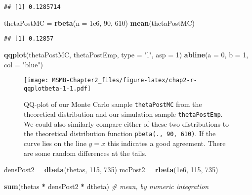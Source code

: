 \documentclass[]{article}
\newenvironment{Shaded}{\begin{snugshade}}{\end{snugshade}}
\newcommand{\KeywordTok}[1]{\textcolor[rgb]{0.13,0.29,0.53}{\textbf{#1}}}
\newcommand{\DataTypeTok}[1]{\textcolor[rgb]{0.13,0.29,0.53}{#1}}
\newcommand{\DecValTok}[1]{\textcolor[rgb]{0.00,0.00,0.81}{#1}}
\newcommand{\FloatTok}[1]{\textcolor[rgb]{0.00,0.00,0.81}{#1}}
\newcommand{\StringTok}[1]{\textcolor[rgb]{0.31,0.60,0.02}{#1}}
\newcommand{\CommentTok}[1]{\textcolor[rgb]{0.56,0.35,0.01}{\textit{#1}}}
\newcommand{\OperatorTok}[1]{\textcolor[rgb]{0.81,0.36,0.00}{\textbf{#1}}}
\newcommand{\NormalTok}[1]{#1}
\begin{document}
\begin{verbatim}
## [1] 0.1285714
\end{verbatim}

\begin{Shaded}
\begin{Highlighting}[]
\NormalTok{thetaPostMC =}\StringTok{ }\KeywordTok{rbeta}\NormalTok{(}\DataTypeTok{n =} \FloatTok{1e6}\NormalTok{, }\DecValTok{90}\NormalTok{, }\DecValTok{610}\NormalTok{)}
\KeywordTok{mean}\NormalTok{(thetaPostMC)}
\end{Highlighting}
\end{Shaded}

\begin{verbatim}
## [1] 0.12857
\end{verbatim}

\begin{Shaded}
\begin{Highlighting}[]
\KeywordTok{qqplot}\NormalTok{(thetaPostMC, thetaPostEmp, }\DataTypeTok{type =} \StringTok{"l"}\NormalTok{, }\DataTypeTok{asp =} \DecValTok{1}\NormalTok{)}
\KeywordTok{abline}\NormalTok{(}\DataTypeTok{a =} \DecValTok{0}\NormalTok{, }\DataTypeTok{b =} \DecValTok{1}\NormalTok{, }\DataTypeTok{col =} \StringTok{"blue"}\NormalTok{)}
\end{Highlighting}
\end{Shaded}

\begin{figure}
\centering
\texttt{[image: MSMB-Chapter2\_files/figure-latex/chap2-r-qqplotbeta-1-1.pdf]}
\caption{QQ-plot of our Monte Carlo sample \texttt{thetaPostMC} from the
theoretical distribution and our simulation sample
\texttt{thetaPostEmp}. We could also similarly compare either of these
two distributions to the theoretical distribution function
\texttt{pbeta(.,\ 90,\ 610)}. If the curve lies on the line \(y=x\) this
indicates a good agreement. There are some random differences at the
tails.}
\end{figure}

\begin{Shaded}
\begin{Highlighting}[]
\NormalTok{densPost2 =}\StringTok{ }\KeywordTok{dbeta}\NormalTok{(thetas, }\DecValTok{115}\NormalTok{, }\DecValTok{735}\NormalTok{)}
\NormalTok{mcPost2   =}\StringTok{ }\KeywordTok{rbeta}\NormalTok{(}\FloatTok{1e6}\NormalTok{, }\DecValTok{115}\NormalTok{, }\DecValTok{735}\NormalTok{)}

\KeywordTok{sum}\NormalTok{(thetas }\OperatorTok{*}\StringTok{ }\NormalTok{densPost2 }\OperatorTok{*}\StringTok{ }\NormalTok{dtheta)  }\CommentTok{# mean, by numeric integration}
\end{Highlighting}
\end{Shaded}
\end{document}
